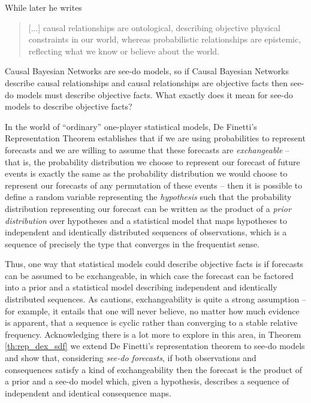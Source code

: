 While later he writes

\begin{quote}
[...] causal relationships are ontological, describing objective physical constraints in our world, whereas probabilistic relationships are epistemic, reflecting what we know or believe about the world.
\end{quote}

Causal Bayesian Networks are see-do models, so if Causal Bayesian Networks describe causal relationships and causal relationships are objective facts then see-do models must describe objective facts. What exactly does it mean for see-do models to describe objective facts?

In the world of ``ordinary'' one-player statistical models, De Finetti's Representation Theorem establishes that if we are using probabilities to represent forecasts and we are willing to assume that these forecasts are \emph{exchangeable} -- that is, the probability distribution we choose to represent our forecast of future events is exactly the same as the probability distribution we would choose to represent our forecasts of any permutation of these events -- then it is possible to define a random variable representing the \emph{hypothesis} such that the probability distribution representing our forecast can be written as the product of a \emph{prior distribution} over hypotheses and a statistical model that maps hypotheses to independent and identically distributed sequences of observations, which is a sequence of precisely the type that converges in the frequentist sense.

Thus, one way that statistical models could describe objective facts is if forecasts can be assumed to be exchangeable, in which case the forecast can be factored into a prior and a statistical model describing  independent and identically distributed sequences. As \citet{walley_statistical_1991} cautions, exchangeability is quite a strong assumption -- for example, it entails that one will never believe, no matter how much evidence is apparent, that a sequence is cyclic rather than converging to a stable relative frequency. Acknowledging there is a lot more to explore in this area, in Theorem \ref{th:rep_dex_sdf} we extend De Finetti's representation theorem to see-do models and show that, considering \emph{see-do forecasts}, if both observations and consequences satisfy a kind of exchangeability then the forecast is the product of a prior and a see-do model which, given a hypothesis, describes a sequence of independent and identical consequence maps.

